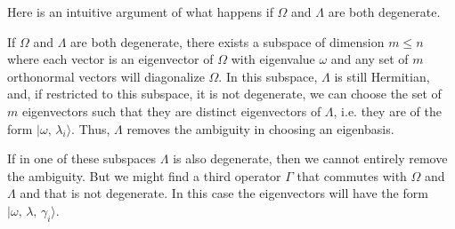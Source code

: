 \documentclass[11pt,fleqn]{book} %
\newcommand{\ket}[1]{| #1\rangle}
\begin{document}
\begin{remark}
    Here is an intuitive argument of what happens if $\Omega$ and $\Lambda$ are both degenerate.

    If $\Omega$ and $\Lambda$ are both degenerate, there exists a subspace of dimension $m\leq n$ where each vector is an eigenvector of
    $\Omega$ with eigenvalue $\omega$ and any set of $m$ orthonormal vectors will diagonalize $\Omega$. In this subspace,
    $\Lambda$ is still Hermitian, and, if restricted to this subspace, it is not degenerate, we can choose the set of $m$ eigenvectors such 
    that they are distinct eigenvectors of $\Lambda$, i.e. they are of the form $\ket{\omega,\,\lambda_i}$. 
    Thus, $\Lambda$ removes the ambiguity in choosing an eigenbasis.

    If in one of these subspaces $\Lambda$ is also degenerate, then we cannot entirely remove the ambiguity. But we might find a third 
    operator $\Gamma$ that commutes with $\Omega$ and $\Lambda$ and that is not degenerate. In this case the eigenvectors will have the 
    form $\ket{\omega,\,\lambda,\,\gamma_i}$.
\end{remark}
\end{document}
